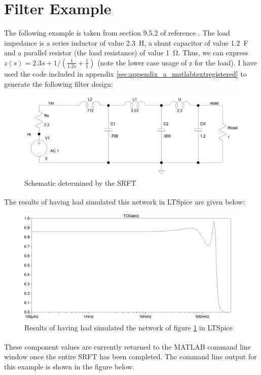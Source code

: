 \section*{Filter Example}

The following example is taken from section 9.5.2 of reference \cite{opt}. The
load impedance is a series inductor of value \SI{2.3}{\henry}, a shunt capacitor
of value \SI{1.2}{\farad} and a parallel resistor (the load resistance) of value
\SI{1}{\ohm}. Thus, we can express $z(s) = 2.3s + 1/(\frac{1}{1.2s} +
\frac{1}{1})$ (note the lower case usage of z for the load). I have used the
code included in appendix \ref{sec:appendix_a_matlabtextregistered} to generate
the following filter design:

\begin{figure}[H]
    \centering
    \includegraphics[width=0.8\linewidth]{../img/Load.PNG}
    \caption{Schematic determined by the SRFT}
    \label{fig:load}
\end{figure}

The results of having had simulated this network in
LTSpice\textsuperscript{\textregistered} are given below:

\begin{figure}[H]
    \centering
    \includegraphics[width=0.8\linewidth]{../img/LTSpiceResults.png}
    \caption{Results of having had simulated the network of figure
    \ref{fig:load} in LTSpice\textsuperscript{\textregistered}}
    \label{fig:LTSpiceResults}
\end{figure}

These component values are currently returned to the
MATLAB\textsuperscript{\textregistered} command line window once the entire SRFT
has been completed. The command line output for this example is shown in the
figure below.

